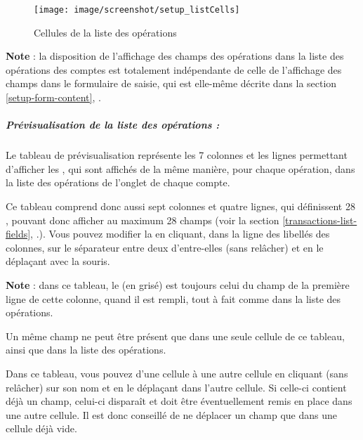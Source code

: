 \ifIllustration
\begin{figure}[ht]
\begin{center}
\texttt{[image: image/screenshot/setup\_listCells]}
\end{center}
\caption{Cellules de la liste des opérations}
\label{setup-listCells-img}
\end{figure}
\fi

\textbf{Note} : la disposition de l'affichage des champs des opérations dans la liste des opérations des comptes est totalement indépendante de celle de  l'affichage des champs dans le formulaire de saisie, qui est elle-même décrite dans la section \vref{setup-form-content}, .

\ifIllustration
\else
\fi


\subparagraph{Prévisualisation de la liste des opérations :\label{setup-operations-cells-display}}

Le tableau de prévisualisation représente les 7 colonnes et les lignes permettant d'afficher les , qui sont affichés de la même manière, pour chaque opération, dans la liste des opérations de l'onglet  de chaque compte.

Ce tableau comprend donc aussi sept colonnes et quatre lignes, qui définissent 28 , pouvant donc afficher au maximum 28 champs (voir la section \vref{transactions-list-fields}, .). Vous pouvez modifier la  en cliquant, dans la ligne des libellés des colonnes, sur le séparateur entre deux d'entre-elles (sans relâcher) et en le déplaçant avec la souris.

\textbf{Note} : dans ce tableau, le  (en grisé) est toujours celui du champ de la première ligne de cette colonne, quand il est rempli, tout à fait comme dans la liste des opérations.

Un même champ ne peut être présent que dans une seule cellule de ce tableau, ainsi que dans la liste des opérations.

Dans ce tableau, vous pouvez 
 d'une cellule à une autre cellule en cliquant (sans relâcher) sur son nom et en le déplaçant dans l'autre cellule. Si celle-ci contient déjà un champ, celui-ci disparaît et doit être éventuellement remis en place dans une autre cellule. Il est donc conseillé de ne déplacer un champ que dans une cellule déjà vide.


